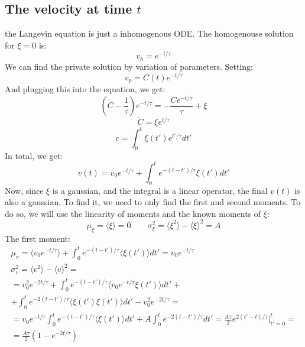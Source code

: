 \documentclass{article}
\begin{document}
\subsection{The velocity at time $t$}
the Langevin equation is just a inhomogenous ODE. The homogenouse solution for $\xi = 0$ is:
\begin{equation}
    v_h = e^{-t/\tau}
\end{equation}
We can find the private solution by variation of parameters. Setting:
\begin{equation}
    v_p = C(t)e^{-t/\tau}
\end{equation}
And plugging this into the equation, we get:
\begin{equation}
    \left(\dot{C} - \frac{1}{\tau}\right) e^{-t/\tau} = -\frac{C e^{-t/\tau}}{\tau} + \xi
\end{equation}
\begin{equation}
    \dot{C} = \xi e^{t/\tau}
\end{equation}
\begin{equation}
    c = \int_0^t \xi(t') e^{t'/\tau}dt'
\end{equation}
In total, we get:
\begin{equation}
    v(t) = v_0 e^{-t/\tau} + \int_0^t e^{-(t - t')/\tau} \xi(t')dt'
\end{equation}
Now, since $\xi$ is a gaussian, and the integral is a linear operator, the final $v(t)$ is also a gaussian. To find it, we need to only find the first and second moments. To do so, we will use the linearity of moments and the known moments of $\xi$:
\begin{equation}
    \mu_\xi = \langle \xi \rangle = 0 \qquad
    \sigma_\xi^2 = \langle \xi^2 \rangle - \langle \xi \rangle^2 = A
\end{equation}
\newline
The first moment:
\begin{equation}
\begin{gathered}
    \mu_v = \langle v_0 e^{-t/\tau} \rangle + \int_0^t e^{-(t - t')/\tau} \langle \xi(t') \rangle dt' = v_0 e^{-t/\tau} \\
    \sigma_v^2 = \langle v^2 \rangle - \langle v \rangle^2 = \\ =
    v_0^2 e^{-2t/\tau} + \int_0^t e^{-(t - t')/\tau} \langle v_0 e^{-t/\tau}\xi(t') \rangle dt' + \\ + \int_0^t e^{-2(t - t')/\tau} \langle \xi(t')\xi(t') \rangle dt' - v_0^2 e^{-2t/\tau} = \\ =
    v_0 e^{-t/\tau} \int_0^t e^{-(t - t')/\tau} \langle \xi(t') \rangle dt' + A \int_0^t e^{-2(t - t')/\tau} dt' =
    \frac{A \tau}{2} e^{2(t' - t)/\tau}\Big|_{t' = 0}^t  = \\ =
    \frac{A \tau}{2} \left(1 - e^{-2t/\tau}\right)
\end{gathered}
\end{equation}
\end{document}
